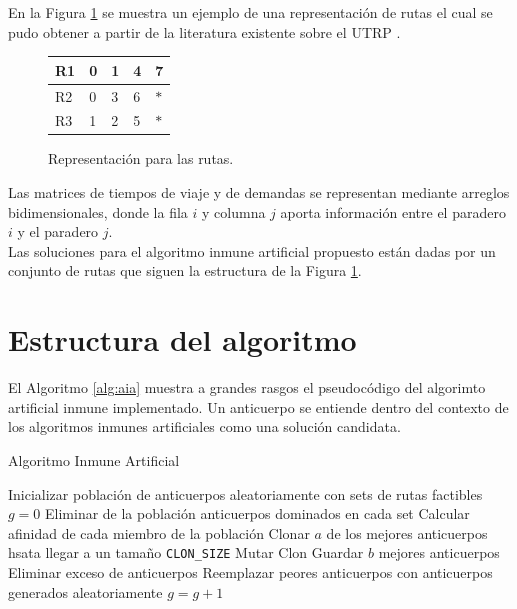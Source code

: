 \documentclass{llncs}
\begin{document}
En la Figura \ref{fig:repr1} se muestra un ejemplo de una representación de rutas el cual se pudo obtener a partir de la literatura existente sobre el UTRP \cite{metaheuristic2010}.

\begin{figure}[!htb]
\begin{center}
\begin{tabular}{|p{0.8cm}|p{0.8cm}|p{0.8cm}|p{0.8cm}|p{0.8cm}|}
\hline
R1 & 0 & 1 & 4 & 7\\
\hline
R2 & 0 & 3 & 6 & $*$\\
\hline
R3 & 1 & 2 & 5 & $*$\\
\hline
\end{tabular}
\caption{Representación para las rutas.}
\label{fig:repr1}
\end{center}
\end{figure}

Las matrices de tiempos de viaje y de demandas se representan mediante arreglos bidimensionales, donde la fila $i$ y columna $j$ aporta información entre el paradero $i$ y el paradero $j$.\\

Las soluciones para el algoritmo inmune artificial propuesto están dadas por un conjunto de rutas que siguen la estructura de la Figura \ref{fig:repr1}.

\section{Estructura del algoritmo}

El Algoritmo \ref{alg:aia} muestra a grandes rasgos el pseudocódigo del algorimto artificial inmune implementado. Un anticuerpo se entiende dentro del contexto de los algoritmos inmunes artificiales como una solución candidata.

\begin{algorithm}
\caption{Algoritmo Inmune Artificial}\label{alg:aia}
\begin{algorithmic}[1]
\STATE Inicializar población de anticuerpos aleatoriamente con sets de rutas factibles
\STATE $g=0$
	\STATE Eliminar de la población anticuerpos dominados en cada set
	\STATE Calcular afinidad de cada miembro de la población
	\STATE Clonar $a$ de los mejores anticuerpos hsata llegar a un tamaño \texttt{CLON\_SIZE}
		\STATE Mutar Clon
	\ENDFOR
	\STATE Guardar $b$ mejores anticuerpos	
	\STATE Eliminar exceso de anticuerpos
	\STATE Reemplazar peores anticuerpos con anticuerpos generados aleatoriamente
	\STATE $g=g+1$
\ENDWHILE
\end{algorithmic}
\end{algorithm}
\end{document}
